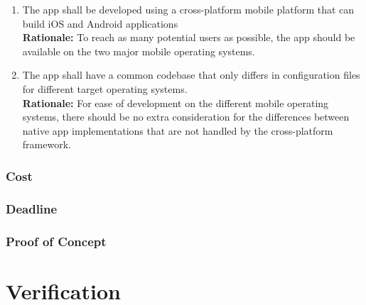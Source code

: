 \documentclass{article}
\begin{document}

\begin{enumerate}[align=left, label=\textbf{DI-P\arabic*.}]
    \item The app shall be developed using a cross-platform mobile platform that can build iOS and Android applications\\
    {\bf Rationale:} To reach as many potential users as possible, the app should be available on the two major mobile operating systems.
    \item The app shall have a common codebase that only differs in configuration files for different target operating systems.\\
    {\bf Rationale:} For ease of development on the different mobile operating systems, there should be no extra consideration for the differences between native app implementations that are not handled by the cross-platform framework.
\end{enumerate}

\subsubsection{Cost}


\subsubsection{Deadline}


\subsubsection{Proof of Concept}

\section{Verification}

\end{document}
